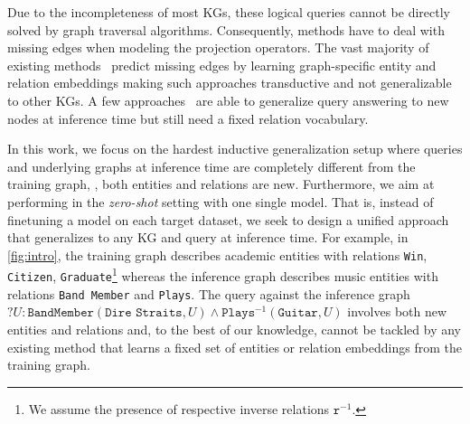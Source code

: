 
Due to the incompleteness of most KGs, these logical queries cannot be directly solved by graph traversal algorithms. Consequently, \clqa methods have to deal with missing edges when modeling the projection operators.
The vast majority of existing \clqa methods~\citep{ren2023ngdb,q2b,betae,cqd,qto} %
predict missing edges by learning graph-specific entity and relation embeddings making such approaches transductive and not generalizable to other KGs. 
A few approaches~\citep{gnn_qe,galkin2022,sheaves} are able to generalize query answering to new nodes at inference time but still need a fixed relation vocabulary.

In this work, we focus on the hardest inductive generalization setup where queries and underlying graphs at inference time are completely different from the training graph, \ie, both entities and relations are new.   
Furthermore, we aim at performing \clqa in the \emph{zero-shot} setting with one single model. That is, instead of %
finetuning a model on each target dataset,
we seek to design a unified approach that generalizes to any KG and %
query at inference time.
For example, in \autoref{fig:intro}, the training graph describes academic entities with relations \texttt{Win}, \texttt{Citizen}, \texttt{Graduate}\footnote{We assume the presence of respective inverse relations $\texttt{r}^{-1}$.} whereas the inference graph describes music entities with relations \texttt{Band Member} and \texttt{Plays}. 
The query against the inference graph $?U:\texttt{BandMember}(\texttt{Dire Straits}, U) \wedge \texttt{Plays}^{-1}(\texttt{Guitar}, U)$ involves both new entities 
and relations 
and, to the best of our knowledge, cannot be tackled by any existing \clqa method that learns a fixed set of entities or relation embeddings from the training graph.

